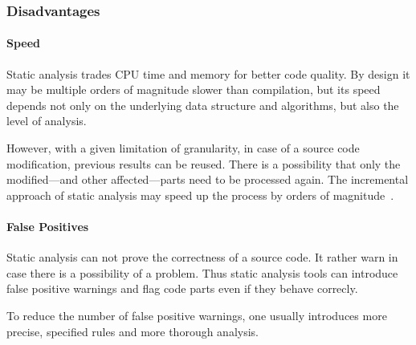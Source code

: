 \subsubsection{Disadvantages}
\paragraph{Speed} Static analysis trades CPU time and memory for better code quality. By design it may be multiple orders of magnitude slower than compilation, but its speed depends not only on the underlying data structure and algorithms, but also the level of analysis.
%
%

However, with a given limitation of granularity, in case of a source code modification, previous results can be reused. There is a possibility that only the modified---and other affected---parts need to be processed again. The incremental approach of static analysis may speed up the process by orders of magnitude~\cite{stein-daniel-bsc}.

\paragraph{False Positives} Static analysis can not prove the correctness of a source code. It rather warn in case there is a possibility of a problem. Thus static analysis tools can introduce false positive warnings and flag code parts even if they behave correcly.

To reduce the number of false positive warnings, one usually introduces more precise, specified rules and more thorough analysis.

%
%

